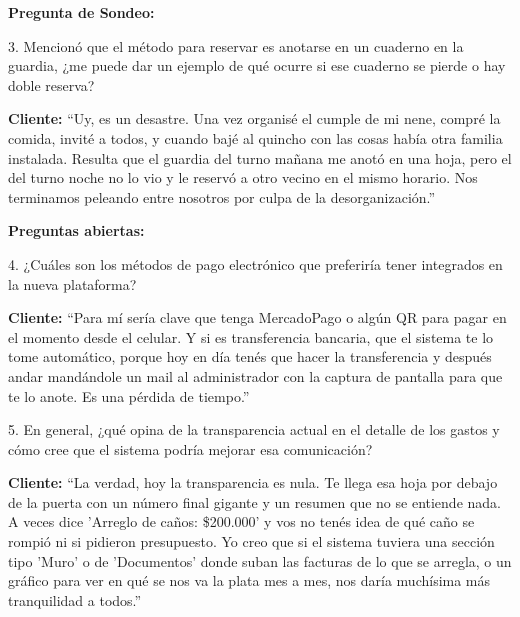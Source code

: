 \textbf{Pregunta de Sondeo:}

3. Mencionó que el método para reservar es anotarse en un cuaderno en la guardia, ¿me puede dar un ejemplo de qué ocurre si ese cuaderno se pierde o hay doble reserva? 

\textbf{Cliente:} ``Uy, es un desastre. Una vez  organisé el cumple de mi nene, compré la comida, invité a todos, y cuando bajé al quincho con las cosas había otra familia instalada. Resulta que el guardia del turno mañana me anotó en una hoja, pero el del turno noche no lo vio y le reservó a otro vecino en el mismo horario. Nos terminamos peleando entre nosotros por culpa de la desorganización.''  

\textbf{Preguntas abiertas:}

4. ¿Cuáles son los métodos de pago electrónico que preferiría tener integrados en la nueva plataforma? 

\textbf{Cliente:} ``Para mí sería clave que tenga MercadoPago o algún QR para pagar en el momento desde el celular. Y si es transferencia bancaria, que el sistema te lo tome automático, porque hoy en día tenés que hacer la transferencia y después andar mandándole un mail al administrador con la captura de pantalla para que te lo anote. Es una pérdida de tiempo.''

5. En general, ¿qué opina de la transparencia actual en el detalle de los gastos y cómo cree que el sistema podría mejorar esa comunicación? 

\textbf{Cliente:} ``La verdad, hoy la transparencia es nula. Te llega esa hoja por debajo de la puerta con un número final gigante y un resumen que no se entiende nada. A veces dice 'Arreglo de caños: \$200.000' y vos no tenés idea de qué caño se rompió ni si pidieron presupuesto. Yo creo que si el sistema tuviera una sección tipo 'Muro' o de 'Documentos' donde suban las facturas de lo que se arregla, o un gráfico para ver en qué se nos va la plata mes a mes, nos daría muchísima más tranquilidad a todos.''
